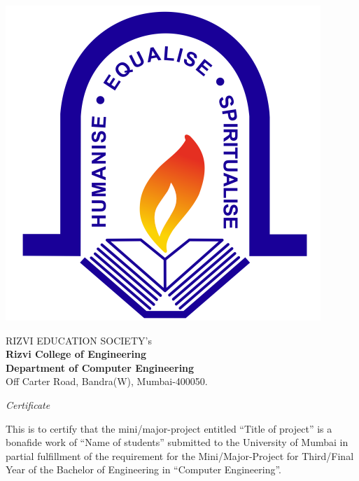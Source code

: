 \documentclass[12pt,a4paper,twoside,openright]{report}
\begin{document}
	\cleardoublepage
	\thispagestyle{empty}
	\vspace*{\fill}
	\begin{center}
		\begin{minipage}{0.25\textwidth}
			\begin{flushright}
				\includegraphics[width=0.7\linewidth]{images/rcoe-logo.png}
			\end{flushright}
		\end{minipage}
		\hfill
		\begin{minipage}{0.70\textwidth}
			\raggedright
			\normalsize  RIZVI EDUCATION SOCIETY's\\
			\LARGE \textbf{Rizvi College of Engineering}\\
			\large \textbf{Department of Computer Engineering}\\
			\normalsize Off Carter Road, Bandra(W), Mumbai-400050.
		\end{minipage}
		
		
	\end{center}
	\vspace{0.5cm}
	\begin{center}
		{\LARGE \textit{Certificate}}\\[1cm]
	\end{center}
	
	
	This is to certify that the mini/major-project entitled “Title of project” is a bonafide work of “Name of students” submitted to the University of Mumbai in partial fulfillment of the requirement for the Mini/Major-Project for Third/Final Year of the Bachelor of Engineering in “Computer Engineering”.
	
\end{document}
